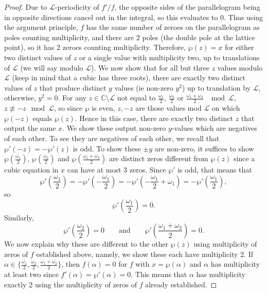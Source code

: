 \documentclass[10pt,a4paper]{amsart}
\begin{document}
\begin{proof}
\newline\newline
Due to $\mathcal L$-periodicity of $f'/f$, the opposite sides of the parallelogram being in opposite directions cancel out in the integral, so this evaluates to $0$. Thus using the argument principle, $f$ has the same number of zeroes on the parallelogram as poles counting multiplicity, and there are $2$ poles (the double pole at the lattice point), so it has $2$ zeroes counting multiplicity. Therefore, $\wp(z)=x$ for either two distinct values of $z$ or a single value with multiplicity two, up to translations of $\mathcal{L}$ (we will say modulo $\mathcal{L}$).
\newline\newline
We now show that for all but three $z$ values modulo $\mathcal{L}$ (keep in mind that a cubic has three roots), there are exactly two distinct values of $z$ that produce distinct $y$ values (ie non-zero $y^2$) up to translation by $\mathcal{L}$, otherwise, $y^2=0$.
\newline\newline
For any $z\in\mathbb C\setminus\mathcal L$ not equal to $\frac{\omega_1}2$, $\frac{\omega_2}2$ or $\frac{\omega_1+\omega_2}2$ $\mod\mathcal{L}$, $z\not\equiv-z\mod\mathcal L$, so since $\wp$ is even, $z,-z$ are those values mod $\mathcal{L}$ on which $\wp(-z)$ equals $\wp(z)$. Hence in this case, there are exactly two distinct $z$ that output the same $x$. We show these output non-zero $y$-values which are negatives of each other. To see they are negatives of each other, we recall that $\wp'(-z)=-\wp'(z)$ is odd. To show these $\pm y$ are non-zero, it suffices to show $\wp(\frac{\omega_1}2)$, $\wp(\frac{\omega_2}2)$ and $\wp(\frac{\omega_1+\omega_2}2)$ are distinct zeros different from $\wp(z)$ since a cubic equation in $x$ can have at most 3 zeros.
\newline\newline
Since $\wp'$ is odd, that means that $$\wp'(\frac{\omega_1}2)=-\wp'(-\frac{\omega_1}2)=-\wp'(-\frac{\omega_1}2+\omega_1)=-\wp'(\frac{\omega_1}2),$$
so 
$$\wp'(\frac{\omega_1}2)=0.$$ Similarly, $$\wp'(\frac{\omega_2}2)=0\qquad \text{and}\qquad \wp'(\frac{\omega_1+\omega_2}2)=0.$$ 
We now explain why these are different to the other $\wp(z)$ using multiplicity of zeros of $f$ established above, namely, we show these each have multiplicity 2. If $\alpha\in\{\frac{\omega_1}2,\frac{\omega_2}2,\frac{\omega_1+\omega_2}2\}$, then $f(\alpha)=0$ for $f$ with $x=\wp(\alpha)$ and $\alpha$ has multiplicity at least two since $f'(\alpha)=\wp'(\alpha)=0$. This means that $\alpha$ has multiplicity exactly 2 using the multiplicity of zeros of $f$ already established.
\newline\newline


\end{proof}
\end{document}
